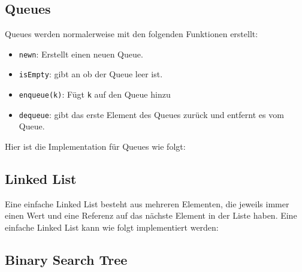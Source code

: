 \documentclass[
../../AuD-Zusammenfassung.tex,
]
{subfiles}
\begin{document}
\subsection{Queues}
Queues werden normalerweise mit den folgenden Funktionen erstellt:
\begin{itemize}
    \item \texttt{new{n}}: Erstellt einen neuen Queue.
    \item \texttt{isEmpty}: gibt an ob der Queue leer ist.
    \item \texttt{enqueue(k)}: Fügt \texttt{k} auf den Queue hinzu
    \item \texttt{dequeue}: gibt das erste Element des Queues zurück und entfernt es vom Queue.
\end{itemize}
Hier ist die Implementation für Queues wie folgt:


\newpage
\subsection{Linked List}
Eine einfache Linked List besteht aus mehreren Elementen, die jeweils immer einen Wert und eine Referenz auf das nächste Element in der Liste haben. Eine einfache Linked List kann wie folgt implementiert werden:




\newpage
\subsection{Binary Search Tree}


\newpage

\newpage



\end{document}
